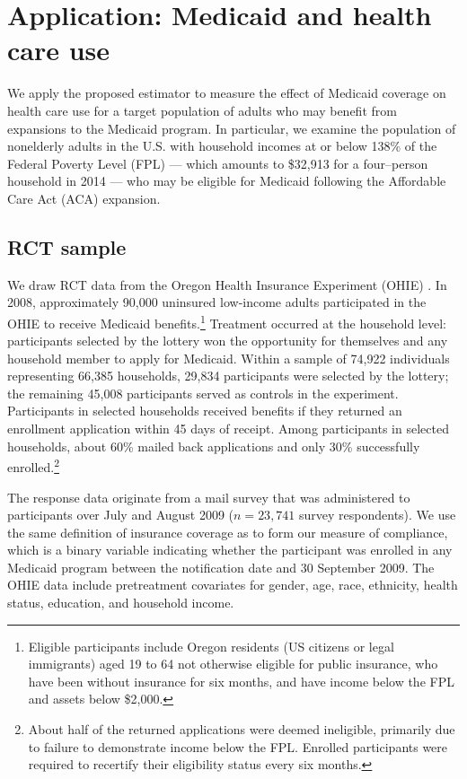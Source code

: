 \documentclass[hidelinks,12pt]{article}
\begin{document}
{\section{Application: Medicaid and health care use} \label{application}

We apply the proposed estimator to measure the effect of Medicaid coverage on health care use for a target population of adults who may benefit from expansions to the Medicaid program. In particular, we examine the population of nonelderly adults in the U.S. with household incomes at or below 138\% of the Federal Poverty Level (FPL) --- which amounts to \$32,913 for a four--person household in 2014 --- who may be eligible for Medicaid following the Affordable Care Act (ACA) expansion.

\subsection{RCT sample} 

We draw RCT data from the Oregon Health Insurance Experiment (OHIE) \citep{finkelstein2012,baicker2013,baicker2014,Taubman}. In 2008, approximately 90,000 uninsured low-income adults participated in the OHIE to receive Medicaid benefits.\footnote{Eligible participants include Oregon residents (US citizens or legal immigrants) aged 19 to 64 not otherwise eligible for public insurance, who have been without insurance for six months, and have income below the FPL and assets below \$2,000.} Treatment occurred at the household level: participants selected by the lottery won the opportunity for themselves and any household member to apply for Medicaid. Within a sample of 74,922 individuals representing 66,385 households, 29,834 participants were selected by the lottery; the remaining 45,008 participants served as controls in the experiment. Participants in selected households received benefits if they returned an enrollment application within 45 days of receipt. Among participants in selected households, about 60\% mailed back applications and only 30\% successfully enrolled.\footnote{{\color{red}About half of the returned applications were deemed ineligible, primarily due to failure to demonstrate income below the FPL. Enrolled participants were required to recertify their eligibility status every six months.}}

The response data originate from a mail survey that was administered to participants over July and August 2009 ($n = 23,741$ survey respondents). We use the same definition of insurance coverage as \citet{finkelstein2012} to form our measure of compliance, which is a binary variable indicating whether the participant was enrolled in any Medicaid program between the notification date and 30 September 2009. The OHIE data include pretreatment covariates for gender, age, race, ethnicity, health status, education, and household income.

}
\end{document}
